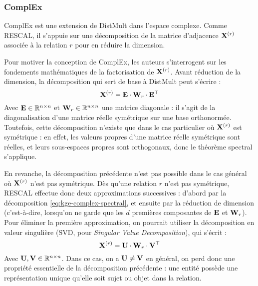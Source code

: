 \subsubsection{ComplEx \cite{complex}}
\label{subsec:complex}

ComplEx est une extension de DistMult dans l'espace complexe. Comme RESCAL, il s'appuie sur une décomposition de la matrice d'adjacence $\bf{X}^{(r)}$ associée à la relation $r$ pour en réduire la dimension.

Pour motiver la conception de ComplEx, les auteurs s'interrogent sur les fondements mathématiques de la factorisation de $\bf{X}^{(r)}$. Avant réduction de la dimension, la décomposition qui sert de base à DistMult peut s'écrire :
\begin{equation}
    \bf{X}^{(r)} = \bf{E} \cdot \bf{W}_r \cdot \bf{E}^\top
    \label{eq:kge-complex-spectral}
\end{equation}
Avec $\bf{E} \in \R^{n \times n}$ et $\bf{W}_r \in \R^{n \times n}$ une matrice diagonale : il s'agit de la diagonalisation d'une matrice réelle symétrique sur une base orthonormée. Toutefois, cette décomposition n'existe que dans le cas particulier où $\bf{X}^{(r)}$ est symétrique : en effet, les valeurs propres d'une matrice réelle symétrique sont réelles, et leurs sous-espaces propres sont orthogonaux, donc le théorème spectral s'applique.

En revanche, la décomposition précédente n'est pas possible dans le cas général où $\bf{X}^{(r)}$ n'est pas symétrique. Dès qu'une relation $r$ n'est pas symétrique, RESCAL effectue donc deux approximations successives : d'abord par la décomposition \ref{eq:kge-complex-spectral}, et ensuite par la réduction de dimension (c'est-à-dire, lorsqu'on ne garde que les $d$ premières composantes de $\bf{E}$ et $\bf{W}_r$). Pour éliminer la première approximation, on pourrait utiliser la décomposition en valeur singulière (SVD, pour \textit{Singular Value Decomposition}), qui s'écrit :
\begin{equation}
    \bf{X}^{(r)} = \bf{U} \cdot \bf{W}_r \cdot \bf{V}^\top
\end{equation}
Avec $\bf{U}, \bf{V} \in \R^{n \times n}$. Dans ce cas, on a $\bf{U \neq V}$ en général, on perd donc une propriété essentielle de la décomposition précédente : une entité possède une représentation unique qu'elle soit sujet ou objet dans la relation. 

